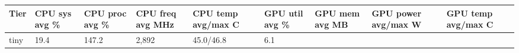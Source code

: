 \documentclass[
  9pt, a4paper, landscape]{article}
\begin{document}
\begin{longtable}[]{@{}lllllllll@{}}
\toprule
\begin{minipage}[b]{0.08\columnwidth}\raggedright
Tier\strut
\end{minipage} & \begin{minipage}[b]{0.08\columnwidth}\raggedright
CPU sys avg \%\strut
\end{minipage} & \begin{minipage}[b]{0.08\columnwidth}\raggedright
CPU proc avg \%\strut
\end{minipage} & \begin{minipage}[b]{0.08\columnwidth}\raggedright
CPU freq avg MHz\strut
\end{minipage} & \begin{minipage}[b]{0.08\columnwidth}\raggedright
CPU temp avg/max C\strut
\end{minipage} & \begin{minipage}[b]{0.08\columnwidth}\raggedright
GPU util avg \%\strut
\end{minipage} & \begin{minipage}[b]{0.08\columnwidth}\raggedright
GPU mem avg MB\strut
\end{minipage} & \begin{minipage}[b]{0.08\columnwidth}\raggedright
GPU power avg/max W\strut
\end{minipage} & \begin{minipage}[b]{0.08\columnwidth}\raggedright
GPU temp avg/max C\strut
\end{minipage}\tabularnewline
\midrule
\endhead
\begin{minipage}[t]{0.08\columnwidth}\raggedright
tiny\strut
\end{minipage} & \begin{minipage}[t]{0.08\columnwidth}\raggedright
19.4\strut
\end{minipage} & \begin{minipage}[t]{0.08\columnwidth}\raggedright
147.2\strut
\end{minipage} & \begin{minipage}[t]{0.08\columnwidth}\raggedright
2,892\strut
\end{minipage} & \begin{minipage}[t]{0.08\columnwidth}\raggedright
45.0/46.8\strut
\end{minipage} & \begin{minipage}[t]{0.08\columnwidth}\raggedright
6.1\strut
\end{minipage} & \begin{minipage}[t]{0.08\columnwidth}\raggedright

\end{minipage}
\end{longtable}
\end{document}
